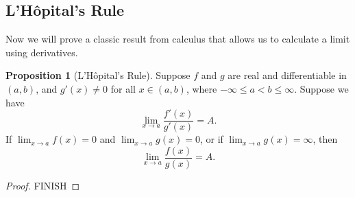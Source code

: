 \documentclass{article}
\theoremstyle{definition}
\newtheorem{proposition}{Proposition}[section]
\begin{document}
\subsection{L'H\^{o}pital's Rule}
Now we will prove a classic result from calculus that allows us to calculate a limit using derivatives.
\begin{proposition}[L'H\^{o}pital's Rule]
	Suppose $ f $ and $ g $ are real and differentiable in $ (a,b) $, and $ g'(x)\neq 0 $ for all $ x\in(a,b) $, where $ -\infty\le a< b\le\infty $. Suppose we have $$\lim_{x\to a}\frac{f'(x)}{g'(x)}=A .$$ If $ \lim_{x\to a}f(x)=0 $ and $ \lim_{x\to a}g(x)=0$, or if $ \lim_{x\to a}g(x)=\infty $, then $$\lim_{x\to a}\frac{f(x)}{g(x)}=A . $$ 
\end{proposition} 
\begin{proof}
	{\color{red}FINISH}
\end{proof}
\end{document}
